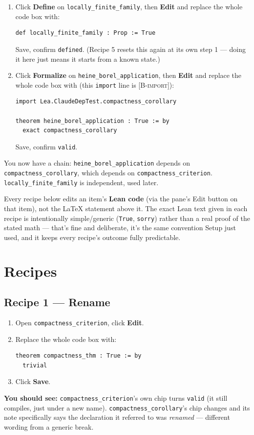 \documentclass[11pt]{article}
\newcommand{\code}[1]{\texttt{#1}}
\newcommand{\see}[1]{\textbf{You should see:} #1}
\begin{document}
\begin{enumerate}[label=\arabic*.]
\begin{enumerate}[label=(\alph*)]
\begin{verbatim}
theorem compactness_corollary : True := by
  exact compactness_criterion
\end{verbatim}
        Save, confirm \code{valid}.
      \item Click \textbf{Define} on \code{locally\_finite\_family}, then
        \textbf{Edit} and replace the whole code box with:
\begin{verbatim}
def locally_finite_family : Prop := True
\end{verbatim}
        Save, confirm \code{defined}. (Recipe 5 resets this again at its
        own step 1 --- doing it here just means it starts from a known
        state.)
      \item Click \textbf{Formalize} on \code{heine\_borel\_application},
        then \textbf{Edit} and replace the whole code box with (this
        \code{import} line is \textsc{[B-import]}):
\begin{verbatim}
import Lea.ClaudeDepTest.compactness_corollary

theorem heine_borel_application : True := by
  exact compactness_corollary
\end{verbatim}
        Save, confirm \code{valid}.
    \end{enumerate}
\end{enumerate}
You now have a chain: \code{heine\_borel\_application} depends on
\code{compactness\_corollary}, which depends on \code{compactness\_criterion}.
\code{locally\_finite\_family} is independent, used later.

Every recipe below edits an item's \textbf{Lean code} (via the pane's Edit
button on that item), not the LaTeX statement above it. The exact Lean text
given in each recipe is intentionally simple/generic (\code{True},
\code{sorry}) rather than a real proof of the stated math --- that's fine and
deliberate, it's the same convention Setup just used, and it keeps every
recipe's outcome fully predictable.

\section{Recipes}

\subsection*{Recipe 1 --- Rename}
\begin{enumerate}[label=\arabic*.]
  \item Open \code{compactness\_criterion}, click \textbf{Edit}.
  \item Replace the whole code box with:
\begin{verbatim}
theorem compactness_thm : True := by
  trivial
\end{verbatim}
  \item Click \textbf{Save}.
\end{enumerate}
\see{\code{compactness\_criterion}'s own chip turns \code{valid} (it still
compiles, just under a new name). \code{compactness\_corollary}'s chip
changes and its note specifically says the declaration it referred to was
\emph{renamed} --- different wording from a generic break.}
\end{document}
